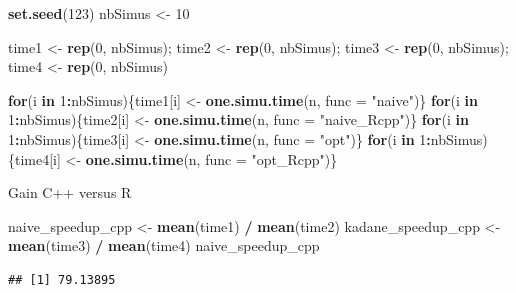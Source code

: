 \documentclass[
]{article}
\newenvironment{Shaded}{\begin{snugshade}}{\end{snugshade}}
\newcommand{\AttributeTok}[1]{\textcolor[rgb]{0.13,0.29,0.53}{#1}}
\newcommand{\ControlFlowTok}[1]{\textcolor[rgb]{0.13,0.29,0.53}{\textbf{#1}}}
\newcommand{\DecValTok}[1]{\textcolor[rgb]{0.00,0.00,0.81}{#1}}
\newcommand{\FunctionTok}[1]{\textcolor[rgb]{0.13,0.29,0.53}{\textbf{#1}}}
\newcommand{\NormalTok}[1]{#1}
\newcommand{\OtherTok}[1]{\textcolor[rgb]{0.56,0.35,0.01}{#1}}
\newcommand{\SpecialCharTok}[1]{\textcolor[rgb]{0.81,0.36,0.00}{\textbf{#1}}}
\newcommand{\StringTok}[1]{\textcolor[rgb]{0.31,0.60,0.02}{#1}}
\begin{document}
\begin{Shaded}
\begin{Highlighting}[]
\FunctionTok{set.seed}\NormalTok{(}\DecValTok{123}\NormalTok{)}
\NormalTok{nbSimus }\OtherTok{\textless{}{-}} \DecValTok{10}

\NormalTok{time1 }\OtherTok{\textless{}{-}} \FunctionTok{rep}\NormalTok{(}\DecValTok{0}\NormalTok{, nbSimus); time2 }\OtherTok{\textless{}{-}} \FunctionTok{rep}\NormalTok{(}\DecValTok{0}\NormalTok{, nbSimus);}
\NormalTok{time3 }\OtherTok{\textless{}{-}} \FunctionTok{rep}\NormalTok{(}\DecValTok{0}\NormalTok{, nbSimus); time4 }\OtherTok{\textless{}{-}} \FunctionTok{rep}\NormalTok{(}\DecValTok{0}\NormalTok{, nbSimus)}

\ControlFlowTok{for}\NormalTok{(i }\ControlFlowTok{in} \DecValTok{1}\SpecialCharTok{:}\NormalTok{nbSimus)\{time1[i] }\OtherTok{\textless{}{-}} \FunctionTok{one.simu.time}\NormalTok{(n, }\AttributeTok{func =} \StringTok{"naive"}\NormalTok{)\}}
\ControlFlowTok{for}\NormalTok{(i }\ControlFlowTok{in} \DecValTok{1}\SpecialCharTok{:}\NormalTok{nbSimus)\{time2[i] }\OtherTok{\textless{}{-}} \FunctionTok{one.simu.time}\NormalTok{(n, }\AttributeTok{func =} \StringTok{"naive\_Rcpp"}\NormalTok{)\}}
\ControlFlowTok{for}\NormalTok{(i }\ControlFlowTok{in} \DecValTok{1}\SpecialCharTok{:}\NormalTok{nbSimus)\{time3[i] }\OtherTok{\textless{}{-}} \FunctionTok{one.simu.time}\NormalTok{(n, }\AttributeTok{func =} \StringTok{"opt"}\NormalTok{)\}}
\ControlFlowTok{for}\NormalTok{(i }\ControlFlowTok{in} \DecValTok{1}\SpecialCharTok{:}\NormalTok{nbSimus)\{time4[i] }\OtherTok{\textless{}{-}} \FunctionTok{one.simu.time}\NormalTok{(n, }\AttributeTok{func =} \StringTok{"opt\_Rcpp"}\NormalTok{)\}}
\end{Highlighting}
\end{Shaded}

Gain C++ versus R

\begin{Shaded}
\begin{Highlighting}[]
\NormalTok{naive\_speedup\_cpp }\OtherTok{\textless{}{-}} \FunctionTok{mean}\NormalTok{(time1) }\SpecialCharTok{/} \FunctionTok{mean}\NormalTok{(time2)}
\NormalTok{kadane\_speedup\_cpp }\OtherTok{\textless{}{-}} \FunctionTok{mean}\NormalTok{(time3) }\SpecialCharTok{/} \FunctionTok{mean}\NormalTok{(time4)}
\NormalTok{naive\_speedup\_cpp}
\end{Highlighting}
\end{Shaded}

\begin{verbatim}
## [1] 79.13895
\end{verbatim}
\end{document}
